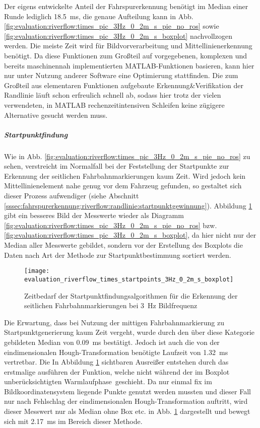 Der eigens entwickelte Anteil der Fahrspurerkennung benötigt im Median einer Runde lediglich \SI{18,5}{ms}, die genaue Aufteilung kann in Abb. \ref{fig:evaluation:riverflow:times_pic_3Hz_0_2m_s_pie_no_ros} sowie \ref{fig:evaluation:riverflow:times_pic_3Hz_0_2m_s_boxplot} nachvollzogen werden. Die meiste Zeit wird für Bildvorverarbeitung und Mittellinienerkennung benötigt. Da diese Funktionen zum Großteil auf vorgegebenen, komplexen und bereits maschinennah implementierten MATLAB-Funktionen basieren, kann hier nur unter Nutzung anderer Software eine Optimierung stattfinden. Die zum Großteil aus elementaren Funktionen aufgebaute Erkennung\&Verifikation der Randlinie läuft schon erfreulich schnell ab, sodass hier trotz der vielen verwendeten, in MATLAB rechenzeitintensiven Schleifen keine zügigere Alternative gesucht werden muss.

\subparagraph{Startpunktfindung}
Wie in Abb. \ref{fig:evaluation:riverflow:times_pic_3Hz_0_2m_s_pie_no_ros} zu sehen, verstreicht im Normalfall bei der Feststellung der Startpunkte zur Erkennung der seitlichen Fahrbahnmarkierungen kaum Zeit. Wird jedoch kein Mittellinienelement nahe genug vor dem Fahrzeug gefunden, so gestaltet sich dieser Prozess aufwendiger (siehe Abschnitt \ref{sssec:fahrspurerkennung:riverflow:randlinie:startpunktgewinnung}). Abbildung \ref{fig:evaluation:riverflow:times_startpoints_3Hz_0_2m_s_boxplot} gibt ein besseres Bild der Messwerte wieder als Diagramm \ref{fig:evaluation:riverflow:times_pic_3Hz_0_2m_s_pie_no_ros} bzw. \ref{fig:evaluation:riverflow:times_pic_3Hz_0_2m_s_boxplot}, da hier nicht nur der Median aller Messwerte gebildet, sondern vor der Erstellung des Boxplots die Daten nach Art der Methode zur Startpunktbestimmung sortiert werden. 
\begin{figure}[htbp] %
	\centering
	\texttt{[image: evaluation\_riverflow\_times\_startpoints\_3Hz\_0\_2m\_s\_boxplot]}
	\label{fig:evaluation:riverflow:times_startpoints_3Hz_0_2m_s_boxplot}
	\caption{Zeitbedarf der Startpunktfindungsalgorithmen für die Erkennung der seitlichen Fahrbahnmarkierungen bei \SI{3}{\hertz} Bildfrequenz}
\end{figure}
Die Erwartung, dass bei Nutzung der mittigen Fahrbahnmarkierung zu Startpunktgenerierung kaum Zeit vergeht, wurde durch den über diese Kategorie gebildeten Median von \SI{0,09}{ms} bestätigt. Jedoch ist auch die von der eindimensionalen Hough-Transformation benötigte Laufzeit von \SI{1,32}{ms} vertretbar. Die In Abbildung \ref{fig:evaluation:riverflow:times_startpoints_3Hz_0_2m_s_boxplot} sichtbaren Ausreißer entstehen durch das erstmalige ausführen der Funktion, welche nicht während der im Boxplot unberücksichtigten \glqq Warmlaufphase\grqq\ geschieht. Da nur einmal fix im Bildkoordinatensystem liegende Punkte genutzt werden mussten und dieser Fall nur nach Fehlschlag der eindimensionalen Hough-Transformation auftritt, wird dieser Messwert nur als Median ohne Box etc. in Abb. \ref{fig:evaluation:riverflow:times_startpoints_3Hz_0_2m_s_boxplot} dargestellt und bewegt sich mit \SI{2,17}{ms} im Bereich dieser Methode.

